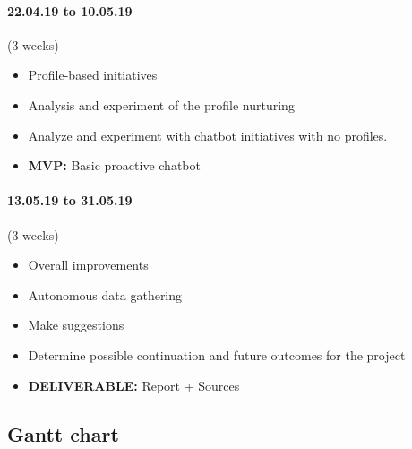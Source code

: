 \paragraph{22.04.19 to 10.05.19} (3 weeks)
\begin{itemize}
	\setlength\itemsep{0em}
	\item Profile-based initiatives
	\item Analysis and experiment of the profile nurturing 
	\item Analyze and experiment with chatbot initiatives with no profiles.
	\item \textbf{MVP:} Basic proactive chatbot
\end{itemize}

\paragraph{13.05.19 to 31.05.19} (3 weeks)
\begin{itemize}
	\setlength\itemsep{0em}
	\item Overall improvements
	\item Autonomous data gathering
	\item Make suggestions
	\item Determine possible continuation and future outcomes for the project
	\item \textbf{DELIVERABLE:} Report + Sources
\end{itemize}

\subsection{Gantt chart}


